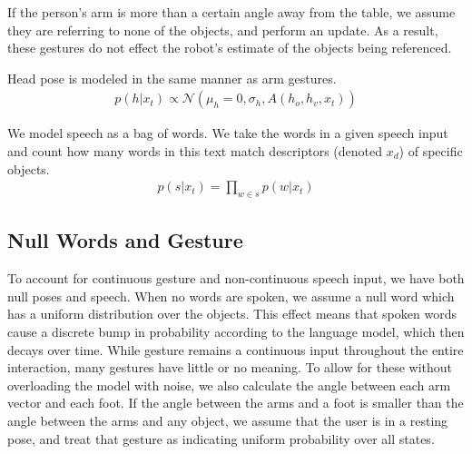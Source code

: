 \documentclass[letterpaper, 10 pt, conference]{ieeeconf}
\begin{document}
If the person's arm is more than a certain angle away from the table,
we assume they are referring to none of the objects, and perform an
update.  As a result, these gestures do not effect the robot's
estimate of the objects being referenced.

Head pose is modeled in the same manner as arm gestures.
\begin{align}
p(h | x_t) \propto \mathcal{N}(\mu_h=0, \sigma_h,A(h_o, h_v, x_t))
\end{align}


  We model speech as a bag of words. We
take the words in a given speech input and count how many words in
this text match descriptors (denoted $x_d$) of specific objects.
\begin{align}
p(s |x_t) = \displaystyle \prod_{w \in s} p(w | x_t)
\end{align}


\subsection{Null Words and Gesture}

To account for continuous gesture and non-continuous speech input, we
have both null poses and speech.  When no words are spoken, we assume
a null word which has a uniform distribution over the objects.  This
effect means that spoken words cause a discrete bump in probability
according to the language model, which then decays over time. While
gesture remains a continuous input throughout the entire interaction,
many gestures have little or no meaning. To allow for these without
overloading the model with noise, we also calculate the angle between
each arm vector and each foot. If the angle between the arms and a
foot is smaller than the angle between the arms and any object, we
assume that the user is in a resting pose, and treat that gesture as indicating uniform probability over all states.
\end{document}
